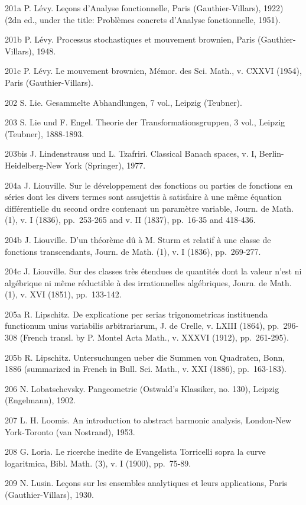 201a P. Lévy. Leçons d'Analyse fonctionnelle, Paris (Gauthier-Villars), 1922) (2dn ed., under the title: Problèmes concrets d'Analyse fonctionnelle, 1951).

201b P. Lévy. Processus stochastiques et mouvement brownien, Paris (Gauthier-Villars), 1948.

201c P. Lévy. Le mouvement brownien, Mémor. des Sci. Math., v. CXXVI (1954), Paris (Gauthier-Villars).

202 S. Lie. Gesammelte Abhandlungen, 7 vol., Leipzig (Teubner).

203 S. Lie und F. Engel. Theorie der Transformationsgruppen, 3 vol., Leipzig (Teubner), 1888-1893.

203bis J. Lindenstrauss und L. Tzafriri. Classical Banach spaces, v. I, Berlin-Heidelberg-New York (Springer), 1977.

204a J. Liouville. Sur le développement des fonctions ou parties de fonctions en séries dont les divers termes sont assujettis à satisfaire à une même équation différentielle du second ordre contenant un paramètre variable, Journ. de Math. (1), v. I (1836), pp.~253-265 and v. II (1837), pp.~16-35 and 418-436.

204b J. Liouville. D'un théorème dû à M. Sturm et relatif à une classe de fonctions transcendants, Journ. de Math. (1), v. I (1836), pp.~269-277.

204c J. Liouville. Sur des classes très étendues de quantités dont la valeur n'est ni algébrique ni même réductible à des irrationnelles algébriques, Journ. de Math. (1), v. XVI (1851), pp.~133-142.

205a R. Lipschitz. De explicatione per serias trigonometricas instituenda functionum unius variabilis arbitrariarum, J. de Crelle, v. LXIII (1864), pp.~296-308 (French transl. by P. Montel Acta Math., v. XXXVI (1912), pp.~261-295).

205b R. Lipschitz. Untersuchungen ueber die Summen von Quadraten, Bonn, 1886 (summarized in French in Bull. Sci. Math., v. XXI (1886), pp.~163-183).

206 N. Lobatschevsky. Pangeometrie (Ostwald's Klassiker, no. 130), Leipzig (Engelmann), 1902.

207 L. H. Loomis. An introduction to abstract harmonic analysis, London-New York-Toronto (van Nostrand), 1953.

208 G. Loria. Le ricerche inedite de Evangelista Torricelli sopra la curve logaritmica, Bibl. Math. (3), v. I (1900), pp.~75-89.

209 N. Lusin. Leçons sur les ensembles analytiques et leurs applications, Paris (Gauthier-Villars), 1930.

